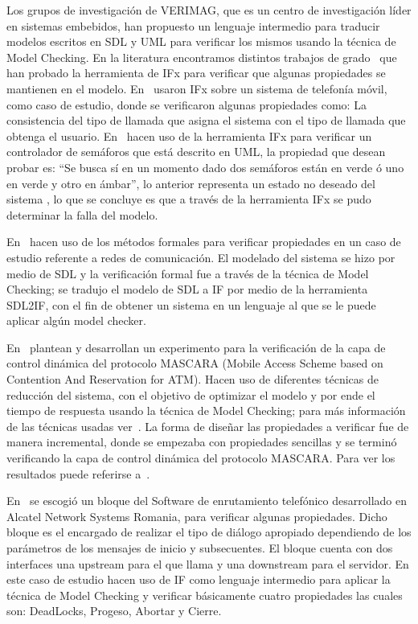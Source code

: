 Los grupos de investigaci\'on de VERIMAG, que es un centro de investigaci\'on l\'ider en sistemas embebidos, han propuesto un lenguaje intermedio para traducir modelos escritos en SDL y UML para verificar los mismos usando la t\'ecnica de Model Checking. En la literatura encontramos distintos trabajos de grado~\cite{BravoParra2006, Perez2006} que han probado la herramienta de IFx para verificar que algunas propiedades se mantienen en el modelo. En~\cite{BravoParra2006} usaron IFx sobre un sistema de telefon\'ia m\'ovil, como caso de estudio, donde se verificaron algunas propiedades como: La consistencia del tipo de llamada que asigna el sistema con el tipo de llamada que obtenga el usuario. En~\cite{Perez2006} hacen uso de la herramienta IFx para verificar un controlador de sem\'aforos que est\'a descrito en UML, la propiedad que desean probar es: “Se busca s\'i en un momento dado dos sem\'aforos est\'an en verde \'o uno en verde y otro en \'ambar”, lo anterior representa un  estado no deseado del sistema , lo que se concluye es que a trav\'es de la herramienta IFx se pudo determinar la falla del modelo.

En~\cite{Vaovic2005} hacen uso de los m\'etodos formales para verificar propiedades en un caso de estudio referente a redes de comunicaci\'on. El modelado del sistema se hizo por medio de SDL y la verificaci\'on formal fue a trav\'es de la t\'ecnica de Model Checking; se tradujo el modelo de SDL a IF por medio de la herramienta SDL2IF, con el fin de obtener un sistema en un lenguaje al que se le puede aplicar alg\'un model checker. 

En~\cite{Jia2001} plantean y desarrollan un experimento para la verificaci\'on de la capa de control din\'amica del protocolo MASCARA (Mobile Access Scheme based on Contention And Reservation for ATM). Hacen uso de diferentes t\'ecnicas de reducci\'on del sistema, con el objetivo de optimizar el modelo y por ende el tiempo de respuesta usando la t\'ecnica  de Model Checking; para m\'as informaci\'on de las t\'ecnicas usadas ver~\cite{Jia2001}. La forma de diseñar las propiedades a verificar fue de manera incremental, donde se empezaba con propiedades sencillas y se termin\'o verificando la capa de control din\'amica del protocolo MASCARA. Para ver los resultados puede referirse a~\cite{Jia2001}.

En~\cite{MariusMinea} se escogi\'o un bloque del  Software de enrutamiento telef\'onico desarrollado en Alcatel Network Systems Romania, para verificar algunas propiedades. Dicho bloque es el encargado de realizar el tipo de di\'alogo apropiado dependiendo de los par\'ametros de los mensajes de inicio y subsecuentes. El bloque cuenta con dos interfaces una upstream para el que llama y una downstream para el servidor. En este caso de estudio hacen uso de IF como lenguaje intermedio para aplicar la t\'ecnica de Model Checking y verificar b\'asicamente cuatro propiedades las cuales son: DeadLocks, Progeso, Abortar y Cierre. 


